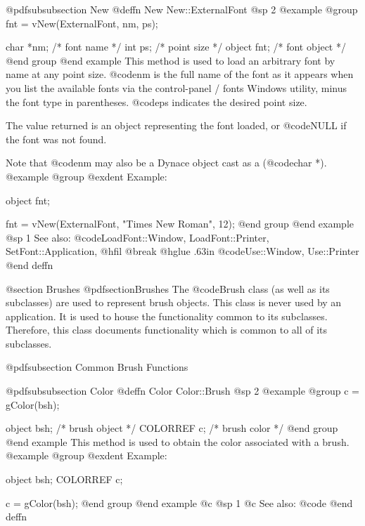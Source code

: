 @pdfsubsubsection {New}
@deffn {New} New::ExternalFont
@sp 2
@example
@group
fnt = vNew(ExternalFont, nm, ps);

char    *nm;    /*  font name    */
int     ps;     /*  point size   */
object  fnt;    /*  font object  */
@end group
@end example
This method is used to load an arbitrary font by name at any point size.
@code{nm} is the full name of the font as it appears
when you list the available fonts via the control-panel / fonts Windows
utility, minus the font type in parentheses.  @code{ps} indicates the
desired point size.

The value returned is an object representing the font loaded, or
@code{NULL} if the font was not found.

Note that @code{nm} may also be a Dynace object cast as a (@code{char *}).
@example
@group
@exdent Example:

object  fnt;

fnt = vNew(ExternalFont, "Times New Roman", 12);
@end group
@end example
@sp 1
See also:  @code{LoadFont::Window, LoadFont::Printer, SetFont::Application,}
@hfil @break @hglue .63in @code{Use::Window, Use::Printer}
@end deffn









@section Brushes
@pdfsection{Brushes}
The @code{Brush} class (as well as its subclasses) are used to represent
brush objects.  This class is never used by an application.  It is used
to house the functionality common to its subclasses.  Therefore, this
class documents functionality which is common to all of its subclasses.






@pdfsubsection {Common Brush Functions}



@pdfsubsubsection {Color}
@deffn {Color} Color::Brush
@sp 2
@example
@group
c = gColor(bsh);

object    bsh;  /*  brush object   */
COLORREF  c;    /*  brush color    */
@end group
@end example
This method is used to obtain the color associated with a brush.
@example
@group
@exdent Example:

object  bsh;
COLORREF  c;

c = gColor(bsh);
@end group
@end example
@c @sp 1
@c See also:  @code{}
@end deffn










